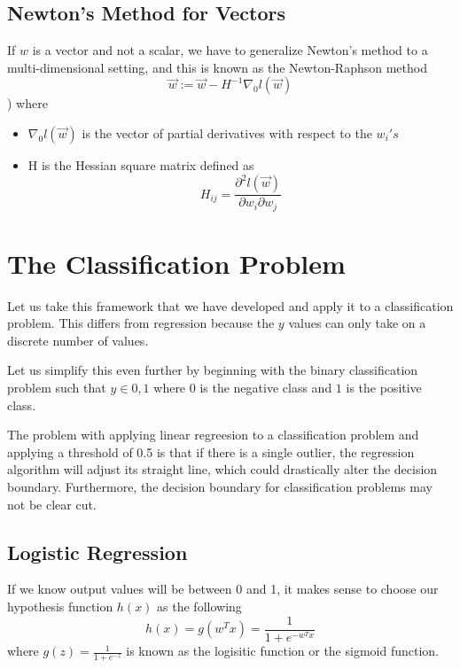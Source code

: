 \documentclass[12pt]{scrartcl}
\begin{document}
\subsection{Newton's Method for Vectors}

If $w$ is a vector and not a scalar, we have
to generalize Newton's method to a multi-dimensional setting,
and this is known as the Newton-Raphson method
\[\vec{w} := \vec{w} - H^{-1}\nabla_0l(\vec{w})\])
where
\begin{itemize}
    \item $\nabla_0l(\vec{w})$ is the vector of partial derivatives
with respect to the $w_i's$
\item H is the Hessian square matrix defined as 
\[H_{ij} = \frac{\partial^2 l(\vec{w})}{\partial w_i \partial w_j}\]
\end{itemize}

\section{The Classification Problem}

Let us take this framework that we have developed and 
apply it to a classification problem. This differs from 
regression because the $y$ values can only take on a discrete
number of values.

Let us simplify this even further by beginning with the 
binary classification problem such that $y \in 0, 1$
where $0$ is the negative class and $1$ is the 
positive class. 

\begin{note}
    The problem with applying linear regreesion to a 
    classification problem and applying a threshold of 0.5 
    is that if there is a single outlier, the regression
    algorithm will adjust its straight line, which could drastically
    alter the decision boundary. Furthermore, the decision
    boundary for classification problems may not be clear cut.
\end{note}

\subsection{Logistic Regression}

If we know output values will be between 0 and 1, 
it makes sense to choose our hypothesis function 
$h(x)$ as the following
\[h(x) = g(w^Tx) = \frac{1}{1 + e^{-w^Tx}}\]
where $g(z) = \frac{1}{1 + e^{-z}}$ is known as 
the logisitic function or the sigmoid function.
\end{document}
